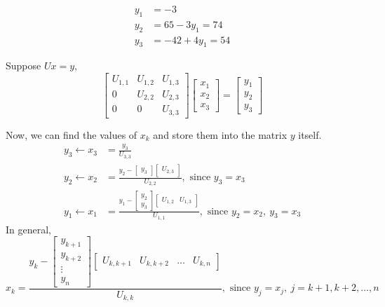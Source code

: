 	\begin{align*}
		y_1 & = -3\\
		y_2 & = 65-3y_1 = 74 \\
		y_3 & = -42 + 4y_1 = 54 
	\end{align*}
\begin{commentary}
	Suppose $Ux = y$,
	\[ \begin{bmatrix} U_{1,1} & U_{1,2} & U_{1,3} \\ 0 & U_{2,2} & U_{2,3} \\ 0 & 0 & U_{3,3} \end{bmatrix} \begin{bmatrix} x_1 \\ x_2 \\ x_3 \end{bmatrix} = \begin{bmatrix}y_1 \\ y_2 \\ y_3 \end{bmatrix} \]

	Now, we can find the values of $x_k$ and store them into the matrix $y$ itself.
	\begin{align*}
		y_3 \leftarrow x_3 & = \frac{y_3}{U_{3,3}} \\
		y_2 \leftarrow x_2 & = \frac{y_2 - \begin{bmatrix} y_3 \end{bmatrix} \begin{bmatrix} U_{2,3} \end{bmatrix}}{U_{2,2}},\text{ since } y_3 = x_3\\
		y_1 \leftarrow x_1 & = \frac{y_1 - \begin{bmatrix} y_2 \\ y_3 \end{bmatrix} \begin{bmatrix} U_{1,2} & U_{1,3} \end{bmatrix}}{U_{1,1}},\text{ since } y_2 = x_2,\ y_3 = x_3
	\end{align*}
	In general,
	\[ x_k = \frac{y_k - \begin{bmatrix} y_{k+1} \\ y_{k+2} \\ \vdots \\ y_n \end{bmatrix} \begin{bmatrix} U_{k,k+1} & U_{k,k+2} & \dots & U_{k,n} \end{bmatrix}}{U_{k,k}},\text{ since } y_j = x_j,\ j = k+1,k+2,\dots,n \]
\end{commentary}
